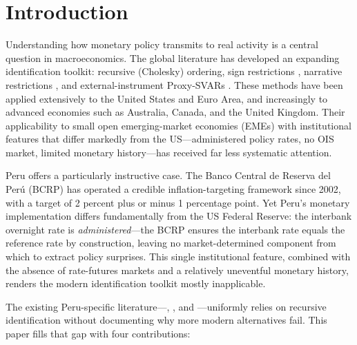 \documentclass[12pt,letterpaper]{article}
\begin{document}
\section{Introduction}
\label{sec:intro}

Understanding how monetary policy transmits to real activity is a central
question in macroeconomics. The global literature has developed an expanding
identification toolkit: recursive (Cholesky) ordering, sign restrictions
\citep{uhlig2005}, narrative restrictions \citep{antolin2018}, and
external-instrument Proxy-SVARs \citep{stock2018,gertler2015,montiellolea2021}.
These methods have been applied extensively to the United States and Euro Area,
and increasingly to advanced economies such as Australia, Canada, and the United Kingdom. Their applicability
to small open emerging-market economies (EMEs) with institutional features
that differ markedly from the US---administered policy rates, no OIS market,
limited monetary history---has received far less systematic attention.

Peru offers a particularly instructive case. The Banco Central de Reserva del
Per\'{u} (BCRP) has operated a credible inflation-targeting framework since
2002, with a target of 2 percent plus or minus 1 percentage point. Yet Peru's monetary implementation
differs fundamentally from the US Federal Reserve: the interbank overnight
rate is \emph{administered}---the BCRP ensures the interbank rate equals
the reference rate by construction, leaving no market-determined component
from which to extract policy surprises. This single institutional feature,
combined with the absence of rate-futures markets and a relatively
uneventful monetary history, renders the modern identification toolkit mostly
inapplicable.

The existing Peru-specific literature---\citet{perezrojo2024},
\citet{castillo2011}, and \citet{portilla2022}---uniformly relies on
recursive identification without documenting why more modern alternatives
fail. This paper fills that gap with four contributions:
\end{document}
